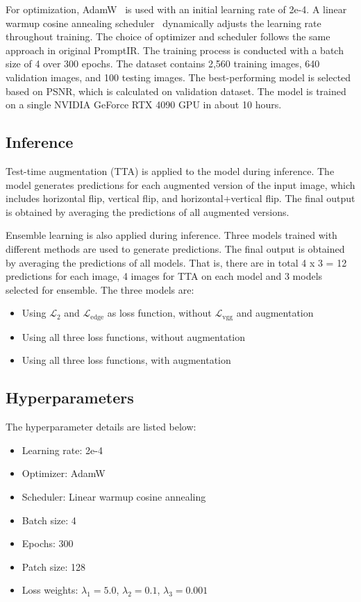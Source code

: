 \documentclass[10pt,twocolumn,letterpaper]{article}
\begin{document}
For optimization, AdamW~\cite{AdamW} is used with an initial learning rate of 2e-4.
A linear warmup cosine annealing scheduler~\cite{LightningSched} dynamically adjusts
the learning rate throughout training. The choice of optimizer and scheduler follows
the same approach in original PromptIR. The training process is conducted with a batch
size of 4 over 300 epochs. The dataset contains 2,560 training images, 640 validation
images, and 100 testing images. The best-performing model is selected based on PSNR,
which is calculated on validation dataset. The model is trained on a single NVIDIA
GeForce RTX 4090 GPU in about 10 hours. 

\subsection{Inference}
\label{subsec:inference}

Test-time augmentation (TTA) is applied to the model during inference. The
model generates predictions for each augmented version of the input image,
which includes horizontal flip, vertical flip, and horizontal+vertical flip.
The final output is obtained by averaging the predictions of all augmented
versions.

Ensemble learning is also applied during inference. Three models trained with
different methods are used to generate predictions. The final output
is obtained by averaging the predictions of all models. That is, there are in total
4 x 3 = 12 predictions for each image, 4 images for TTA on each model and 3 models
selected for ensemble. The three models are:
\begin{itemize}
  \setlength\itemsep{0pt}
  \item Using $\mathcal{L}_{2}$ and $\mathcal{L}_{\text{edge}}$
    as loss function, without $\mathcal{L}_{\text{vgg}}$ and augmentation
  \item Using all three loss functions, without augmentation
  \item Using all three loss functions, with augmentation
\end{itemize}

\subsection{Hyperparameters}

\noindent The hyperparameter details are listed below:
\begin{itemize}
  \setlength\itemsep{0pt}
  \item Learning rate: 2e-4
  \item Optimizer: AdamW~\cite{AdamW}
  \item Scheduler: Linear warmup cosine annealing~\cite{LightningSched}
  \item Batch size: 4
  \item Epochs: 300
  \item Patch size: 128
  \item Loss weights: $\lambda_1 = 5.0$, $\lambda_2 = 0.1$, $\lambda_3 = 0.001$
\end{itemize}
\end{document}
